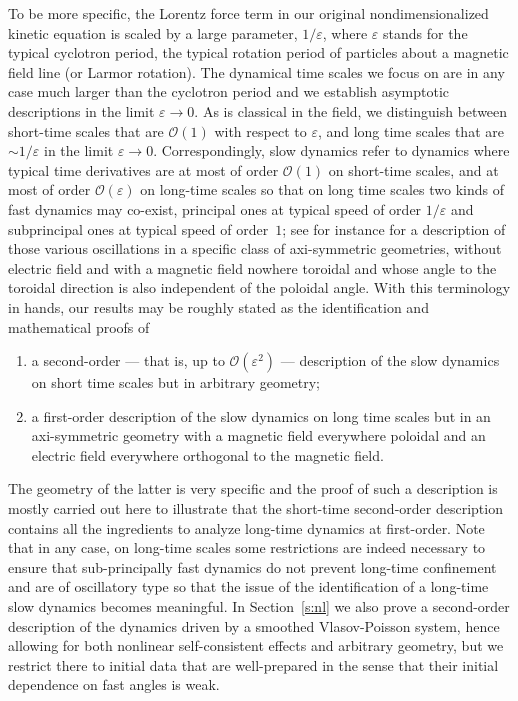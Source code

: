 \documentclass[JEP,XML,SOM,Unicode]{cedram}
\let\mathcal\mathscr
\let\eps\varepsilon
\theoremstyle{plain}
\theoremstyle{definition}
\newcommand\cO{{\mathcal O}}
\begin{document}
To be more specific, the Lorentz force term in our original nondimensionalized kinetic equation is scaled by a large parameter, $1/\eps$, where $\eps$ stands for the typical cyclotron period, \ie the typical rotation period of particles about a magnetic field line (or Larmor rotation). The dynamical time scales we focus on are in any case much larger than the cyclotron period and we establish asymptotic descriptions in the limit $\eps\to0$. As is classical in the field, we distinguish between short-time scales that are $\cO(1)$ with respect to $\eps$, and long time scales that are $\sim1/\eps$ in the limit $\eps\to0$. Correspondingly, slow dynamics refer to dynamics where typical time derivatives are at most of order $\cO(1)$ on short-time scales, and at most of order $\cO(\eps)$ on long-time scales so that on long time scales two kinds of fast dynamics may co-exist, principal ones at typical speed of order $1/\eps$ and subprincipal ones at typical speed of order~$1$; see for instance \cite{cheve2} for a description of those various oscillations in a specific class of axi-symmetric geometries, without electric field and with a magnetic field nowhere toroidal and whose angle to the toroidal direction is also independent of the poloidal angle. With this terminology in hands, our results may be roughly stated as the identification and mathematical proofs of
\begin{enumerate}
\item a second-order --- that is, up to $\cO(\eps^2)$ --- description of the slow dynamics on short time scales but in arbitrary geometry;
\item a first-order description of the slow dynamics on long time scales but in an axi-symmetric geometry with a magnetic field everywhere poloidal and an electric field everywhere orthogonal to the magnetic field.
\end{enumerate}
The geometry of the latter is very specific and the proof of such a description is mostly carried out here to illustrate that the short-time second-order description contains all the ingredients to analyze long-time dynamics at first-order. Note that in any case, on long-time scales some restrictions are indeed necessary to ensure that sub-principally fast dynamics do not prevent long-time confinement and are of oscillatory type so that the issue of the identification of a long-time slow dynamics becomes meaningful. In Section~\ref{s:nl} we also prove a second-order description of the dynamics driven by a smoothed Vlasov-Poisson system, hence allowing for both nonlinear self-consistent effects and arbitrary geometry, but we restrict there to initial data that are well-prepared in the sense that their initial dependence on fast angles is weak.
\end{document}
